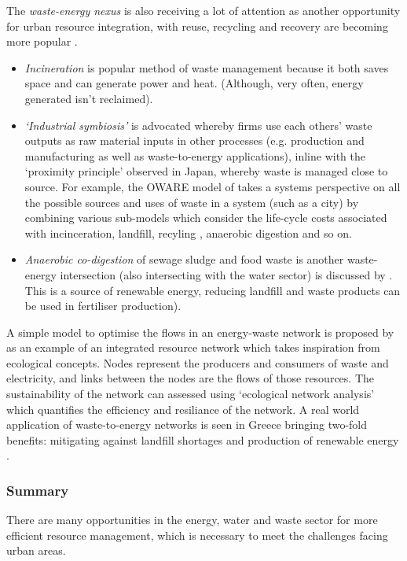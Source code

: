 The \emph{waste-energy nexus} is also receiving a lot of attention as another opportunity for urban resource integration, with reuse, recycling and recovery are becoming more popular \citet{Geng2010}. 
\begin{itemize} 
	\item \emph{Incineration} is popular method of waste management because it both saves space and can generate power and heat. (Although, very often, energy generated isn't reclaimed).  
	\item \emph{`Industrial symbiosis'} is advocated whereby firms use each others' waste outputs as raw material inputs in other processes (e.g. production and manufacturing as well as waste-to-energy applications), inline with the `proximity principle' observed in Japan, whereby waste is managed close to source. For example, the OWARE model of \citep{Eriksson2002} takes a systems perspective on all the possible sources and uses of waste in a system (such as a city) by combining various sub-models which consider the life-cycle costs associated with incinceration, landfill, recyling , anaerobic digestion and so on.
	\item \emph{Anaerobic co-digestion} of sewage sludge and food waste is another waste-energy intersection (also intersecting with the water sector) is discussed by \citet{Iacovidou2012}. This is a source of renewable energy, reducing landfill and waste products can be used in fertiliser production).
\end{itemize}
A simple model to optimise the flows in an energy-waste network is proposed by \citep{Kharrazi2012} as an example of an integrated resource network which takes inspiration from ecological concepts. Nodes represent the producers and consumers of waste and electricity, and links between the nodes are the flows of those resources. The sustainability of the network can assessed using `ecological network analysis' which quantifies the efficiency and resiliance of the network. A real world application of waste-to-energy networks is seen in Greece bringing two-fold benefits: mitigating against landfill shortages and production of renewable energy \citep{Xydis2012}.

\subsubsection*{Summary}
There are many opportunities in the energy, water and waste sector for more efficient resource management, which is necessary to meet the challenges facing urban areas.
%
%
